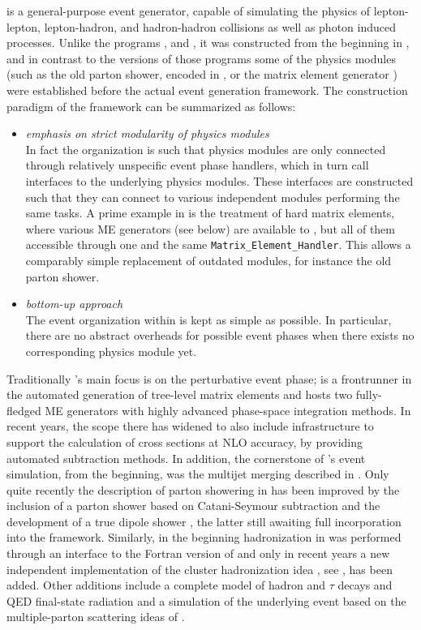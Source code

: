 
\mcsubsection{\gensectionintro}
\label{Sec:intro_sherpa}
\Sherpa is a general-purpose event generator, capable of simulating
the physics of lepton-lepton, lepton-hadron, and hadron-hadron collisions 
as well as photon induced processes. Unlike the programs
 \Ariadne, \Herwig and \Pythia, it was constructed from the beginning in 
\cpp, and in contrast to the \cpp versions of those programs some of the
physics modules (such as the old parton shower, encoded in 
\Apacic, or the matrix element generator \Amegic) were established
before the actual event generation framework.  The construction paradigm
of the \Sherpa framework can be summarized as follows:
\begin{itemize}
\item {\em emphasis on strict modularity of physics modules}\\
  In fact the organization is such that physics modules are only
  connected through relatively unspecific event phase handlers, which in turn
  call interfaces to the underlying physics modules.  These interfaces
  are constructed such that they can connect to various independent
  modules performing the same tasks.  A prime example in \Sherpa is
  the treatment of hard matrix elements, where various ME generators
  (see below) are available to \Sherpa, but all of them accessible 
  through one and the same {\tt Matrix\_Element\_Handler}.  This allows 
  a comparably simple replacement of outdated modules, for instance 
  the old \Apacic parton shower.  
\item {\em bottom-up approach}\\
  The event organization within \Sherpa is kept as simple as possible.
  In particular, there are no abstract overheads for possible 
  event phases when there exists no corresponding physics module yet.
\end{itemize}
Traditionally \Sherpa's main focus is on the perturbative event phase; 
\Sherpa is a frontrunner in the automated generation 
of tree-level matrix elements and hosts two fully-fledged ME generators with
highly advanced phase-space integration methods.  In recent years, the scope
there has widened to also include infrastructure to support the calculation
of cross sections at NLO accuracy, by providing automated subtraction methods.
In addition, the cornerstone of \Sherpa's event simulation, from the beginning,
was the multijet merging described in .
Only quite recently the description of parton showering in \Sherpa has been 
improved by the inclusion of a parton shower based on Catani-Seymour
subtraction \cite{Schumann:2007mg} and the development of a true dipole 
shower \cite{Winter:2007ye}, the latter still awaiting full incorporation 
into the framework.  Similarly, in the beginning hadronization in \Sherpa
was performed through an interface to the Fortran version of \Pythia and
only in recent years a new independent implementation of the cluster
hadronization idea \cite{Winter:2003tt}, see , 
has been added. Other additions include a complete model of hadron and 
$\tau$ decays and QED final-state radiation \cite{Schonherr:2008av} and 
a simulation of the underlying event based on the multiple-parton 
scattering ideas of \cite{Sjostrand:1987su}.

